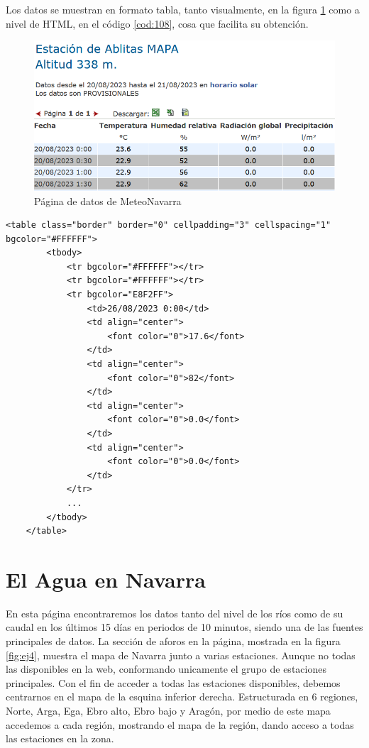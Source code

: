 Los datos se muestran en formato tabla, tanto visualmente, en la figura \ref{fig:ej29} como a nivel de HTML, en el código \ref{cod:108}, cosa que facilita su obtención.

\begin{figure} [H]
	\centering
	\includegraphics[width=.6\linewidth]{fig/MeteoNavarraData.png}
	\caption{Página de datos de MeteoNavarra}
	\label{fig:ej29}
\end{figure}

\begin{lstlisting}[basicstyle=\footnotesize, caption={HTML tabla datos en MeteoNavarra}, label=cod:108]
	<table class="border" border="0" cellpadding="3" cellspacing="1" bgcolor="#FFFFFF">
		<tbody>
			<tr bgcolor="#FFFFFF"></tr>
			<tr bgcolor="#FFFFFF"></tr>
			<tr bgcolor="E8F2FF">
				<td>26/08/2023 0:00</td>
				<td align="center">
					<font color="0">17.6</font>
				</td>
				<td align="center">
					<font color="0">82</font>
				</td>
				<td align="center">
					<font color="0">0.0</font>
				</td>
				<td align="center">
					<font color="0">0.0</font>
				</td>
			</tr>
			...
		</tbody>
	</table>
\end{lstlisting}

\section{El Agua en Navarra}
En esta página encontraremos los datos tanto del nivel de los ríos como de su caudal en los últimos 15 días en periodos de 10 minutos, siendo una de las fuentes principales de datos.
\newline
\newline
La sección de aforos en la página, mostrada en la figura \ref{fig:ej4}, muestra el mapa de Navarra junto a varias estaciones. Aunque no todas las disponibles en la web, conformando unicamente el grupo de estaciones principales.\newline
\newline
Con el fin de acceder a todas las estaciones disponibles, debemos centrarnos en el mapa de la esquina inferior derecha. Estructurada en 6 regiones, Norte, Arga, Ega, Ebro alto, Ebro bajo y Aragón, por medio de este mapa accedemos a cada región, mostrando el mapa de la región, dando acceso a todas las estaciones en la zona.

